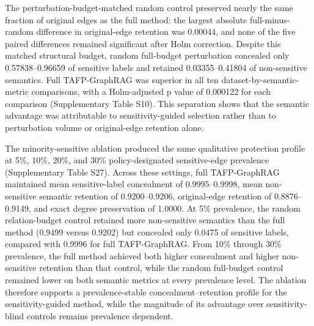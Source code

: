 \documentclass[preprint,12pt]{elsarticle}
\begin{document}
The perturbation-budget-matched random control preserved nearly the same fraction of original edges as the full method: the largest absolute full-minus-random difference in original-edge retention was 0.00044, and none of the five paired differences remained significant after Holm correction. Despite this matched structural budget, random full-budget perturbation concealed only 0.57838--0.96659 of sensitive labels and retained 0.03355--0.41804 of non-sensitive semantics. Full TAFP-GraphRAG was superior in all ten dataset-by-semantic-metric comparisons, with a Holm-adjusted p value of 0.000122 for each comparison (Supplementary Table S10). This separation shows that the semantic advantage was attributable to sensitivity-guided selection rather than to perturbation volume or original-edge retention alone.

The minority-sensitive ablation produced the same qualitative protection profile at 5\%, 10\%, 20\%, and 30\% policy-designated sensitive-edge prevalence (Supplementary Table S27). Across these settings, full TAFP-GraphRAG maintained mean sensitive-label concealment of 0.9995--0.9998, mean non-sensitive semantic retention of 0.9200--0.9206, original-edge retention of 0.8876--0.9149, and exact degree preservation of 1.0000. At 5\% prevalence, the random relation-budget control retained more non-sensitive semantics than the full method (0.9499 versus 0.9202) but concealed only 0.0475 of sensitive labels, compared with 0.9996 for full TAFP-GraphRAG. From 10\% through 30\% prevalence, the full method achieved both higher concealment and higher non-sensitive retention than that control, while the random full-budget control remained lower on both semantic metrics at every prevalence level. The ablation therefore supports a prevalence-stable concealment--retention profile for the sensitivity-guided method, while the magnitude of its advantage over sensitivity-blind controls remains prevalence dependent.
\end{document}
